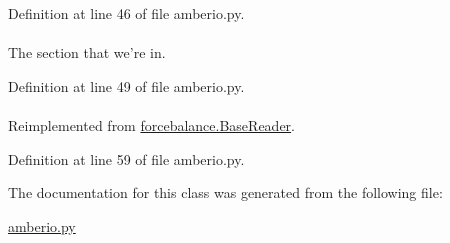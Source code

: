 \-Definition at line 46 of file amberio.\-py.

\hypertarget{classforcebalance_1_1amberio_1_1Mol2__Reader_a254817197733eba261202aab64a1be3d}{
\paragraph[{section}]{}}\label{classforcebalance_1_1amberio_1_1Mol2__Reader_a254817197733eba261202aab64a1be3d}


\-The section that we're in. 



\-Definition at line 49 of file amberio.\-py.

\hypertarget{classforcebalance_1_1amberio_1_1Mol2__Reader_a76b4f0ec6731d7072da6be5768ebf979}{
\paragraph[{suffix}]{}}\label{classforcebalance_1_1amberio_1_1Mol2__Reader_a76b4f0ec6731d7072da6be5768ebf979}


\-Reimplemented from \hyperlink{classforcebalance_1_1BaseReader_a48ef0584a1b6b4b6f8eb741ad8465db8}{forcebalance.\-Base\-Reader}.



\-Definition at line 59 of file amberio.\-py.



\-The documentation for this class was generated from the following file\-:\begin{DoxyCompactItemize}
\item 
\hyperlink{amberio_8py}{amberio.\-py}\end{DoxyCompactItemize}
